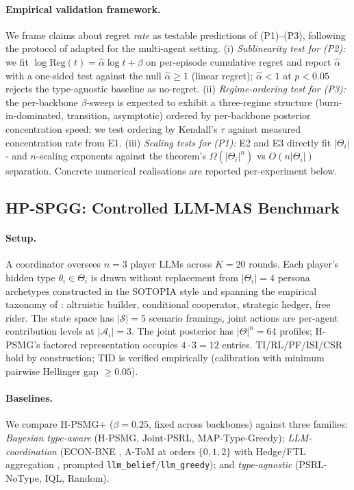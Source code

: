 ﻿\documentclass{article}
\def\textsuperscript#1{#1}%
\begin{document}
\paragraph{Empirical validation framework.} We frame claims about regret \emph{rate} as testable predictions of (P1)--(P3), following the protocol of \citet{park2025regret} adapted for the multi-agent setting. (i) \emph{Sublinearity test for (P2):} we fit $\log\text{Reg}(t) = \hat\alpha \log t + \beta$ on per-episode cumulative regret and report $\hat\alpha$ with a one-sided test against the null $\hat\alpha \geq 1$ (linear regret); $\hat\alpha < 1$ at $p < 0.05$ rejects the type-agnostic baseline as no-regret. (ii) \emph{Regime-ordering test for (P3):} the per-backbone $\beta$-sweep is expected to exhibit a three-regime structure (burn-in-dominated, transition, asymptotic) ordered by per-backbone posterior concentration speed; we test ordering by Kendall's $\tau$ against measured concentration rate from E1. (iii) \emph{Scaling tests for (P1):} E2 and E3 directly fit $|\Theta_i|$- and $n$-scaling exponents against the theorem's $\Omega(|\Theta_i|^n)$ vs $O(n|\Theta_i|)$ separation. Concrete numerical realisations are reported per-experiment below.

\subsection{HP-SPGG: Controlled LLM-MAS Benchmark}
\label{sec:hp-spgg}

\paragraph{Setup.} A coordinator oversees $n{=}3$ player LLMs across $K{=}20$ rounds. Each player's hidden type $\theta_i\!\in\!\Theta_i$ is drawn without replacement from $|\Theta_i|{=}4$ persona archetypes constructed in the SOTOPIA style \citep{zhou2024sotopia} and spanning the empirical taxonomy of \citet{fischbacher2001people}: altruistic builder, conditional cooperator, strategic hedger, free rider. The state space has $|\mathcal S|{=}5$ scenario framings, joint actions are per-agent contribution levels at $|\mathcal A_i|{=}3$. The joint posterior has $|\Theta|^n{=}64$ profiles; H-PSMG's factored representation occupies $4\cdot 3{=}12$ entries. TI/RL/PF/ISI/CSR hold by construction; TID is verified empirically (calibration with minimum pairwise Hellinger gap $\geq 0.05$).

\paragraph{Baselines.} We compare H-PSMG\textsuperscript{+} ($\beta{=}0.25$, fixed across backbones) against three families: \emph{Bayesian type-aware} (H-PSMG, Joint-PSRL, MAP-Type-Greedy); \emph{LLM-coordination} (ECON-BNE \citep{yang2025econ}, A-ToM at orders $\{0,1,2\}$ with Hedge/FTL aggregation \citep{xu2026atom,cesa1997use}, prompted \texttt{llm\_belief}/\texttt{llm\_greedy}); and \emph{type-agnostic} (PSRL-NoType, IQL, Random).
\end{document}
